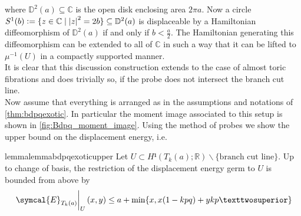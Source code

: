 \documentclass[12pt,a4paper,draft]{scrartcl}
\begin{document}
where $\mathbb{D}^2(a)\subseteq \mathbb{C}$ is the open disk enclosing area $2\pi a$. Now a circle $S^1(b)\vcentcolon=\{z\in \mathbb{C}\mid \abs{z}^2=2b\} \subseteq \mathbb{D}^2(a)$ is displaceable by a Hamiltonian diffeomorphism of $\mathbb{D}^2(a)$ if and only if $b<\frac{a}{2}$. The Hamiltonian generating this diffeomorphism can be extended to all of $\mathbb{C}$ in such a way that it can be lifted to $\mu^{-1}(U)$ in a compactly supported manner.\\
It is clear that this discussion construction extends to the case of almost toric fibrations and does trivially so, if the probe does not intersect the branch cut line.\\
Now assume that everything is arranged as in the assumptions and notations of \cref{thm:bdpqexotic}. In particular the moment image associated to this setup is shown in \cref{fig:Bdpq_moment_image}. Using the method of probes we show the upper bound on the displacement energy, i.e. 

\begin{restatable}{lemma}{lemmabdpqexoticupper}
    \label{thm:lemmabdpqexoticupper}
  Let $U ⊂ H¹(T_k(a);ℝ) ∖ \{\text{branch cut line}\}$.
  Up to change of basis, the restriction of the displacement energy germ to $U$ is bounded from above by
  \[ \eval{\symcal{E}_{T_k(a)}}_U (x,y) \leq a+\min\{x,x(1-kpq)+ykp²\} \]
\end{restatable}
\end{document}

